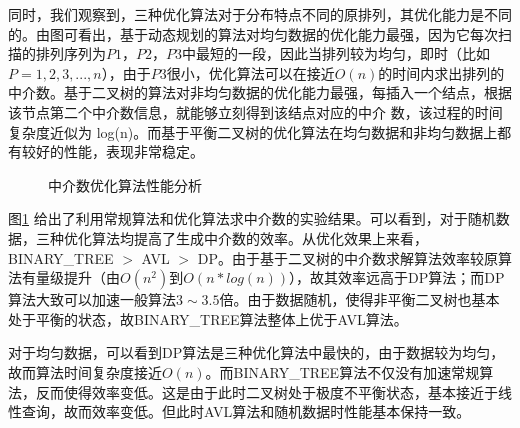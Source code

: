 \documentclass[10pt, twocolumn]{ctexart}
\begin{document}
同时，我们观察到，三种优化算法对于分布特点不同的原排列，其优化能力是不同的。由图可看出，基于动态规划的算法对均匀数据的优化能力最强，因为它每次扫描的排列序列为$P1$，$P2$，$P3$中最短的一段，因此当排列较为均匀，即时（比如$P=1,2,3,...,n$），由于$P3$很小，优化算法可以在接近$O(n)$的时间内求出排列的中介数。基于二叉树的算法对非均匀数据的优化能力最强，每插入一个结点，根据该节点第二个中介数信息，就能够立刻得到该结点对应的中介 数，该过程的时间复杂度近似为 log(n)。而基于平衡二叉树的优化算法在均匀数据和非均匀数据上都有较好的性能，表现非常稳定。
\fi
\begin{figure}[!t]
\centering
{}
\caption{中介数优化算法性能分析}
\label{agency_experiment}
\end{figure}

图\ref{agency_experiment} 给出了利用常规算法和优化算法求中介数的实验结果。可以看到，对于随机数据，三种优化算法均提高了生成中介数的效率。从优化效果上来看，BINARY\_TREE $>$ AVL $>$ DP。由于基于二叉树的中介数求解算法效率较原算法有量级提升（由$O(n^2)$到$O(n*log(n))$），故其效率远高于DP算法；而DP算法大致可以加速一般算法$3 \sim 3.5$倍。由于数据随机，使得非平衡二叉树也基本处于平衡的状态，故BINARY\_TREE算法整体上优于AVL算法。

对于均匀数据，可以看到DP算法是三种优化算法中最快的，由于数据较为均匀，故而算法时间复杂度接近$O(n)$。而BINARY\_TREE算法不仅没有加速常规算法，反而使得效率变低。这是由于此时二叉树处于极度不平衡状态，基本接近于线性查询，故而效率变低。但此时AVL算法和随机数据时性能基本保持一致。
\end{document}
